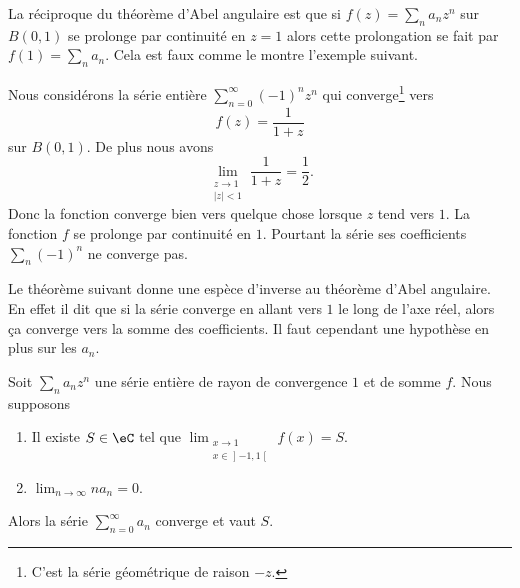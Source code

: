 La réciproque du théorème d'Abel angulaire est que si \( f(z)=\sum_na_nz^n\) sur \( B(0,1)\) se prolonge par continuité en \( z=1\) alors cette prolongation se fait par \( f(1)=\sum_na_n\). Cela est faux comme le montre l'exemple suivant.

\begin{example}
	Nous considérons la série entière \( \sum_{n=0}^{\infty}(-1)^nz^n\) qui converge\footnote{C'est la série géométrique de raison \( -z\).} vers
	\begin{equation}
		f(z)=\frac{1}{ 1+z }
	\end{equation}
	sur \( B(0,1)\). De plus nous avons
	\begin{equation}
		\lim_{\substack{z\to 1\\    | z |<1}}\frac{1}{ 1+z }=\frac{ 1 }{2}.
	\end{equation}
	Donc la fonction converge bien vers quelque chose lorsque \( z\) tend vers \( 1\). La fonction \( f\) se prolonge par continuité en \( 1\). Pourtant la série ses coefficients \( \sum_n(-1)^n\) ne converge pas.
\end{example}

Le théorème suivant donne une espèce d'inverse au théorème d'Abel angulaire. En effet il dit que si la série converge  en allant vers \( 1\) le long de l'axe réel, alors ça converge vers la somme des coefficients. Il faut cependant une hypothèse en plus sur les \( a_n\).
\begin{theorem}
	Soit \( \sum_na_nz^n\) une série entière de rayon de convergence \( 1\) et de somme \( f\). Nous supposons
	\begin{enumerate}
		\item
		      Il existe \( S\in \eC\) tel que \( \lim_{\substack{x\to 1\\x\in\mathopen] -1 , 1 \mathclose[}}f(x)=S\).
		\item
		      \( \lim_{n\to \infty} na_n=0\).
	\end{enumerate}
	Alors la série \( \sum_{n=0}^{\infty}a_n\) converge et vaut \( S\).
\end{theorem}

